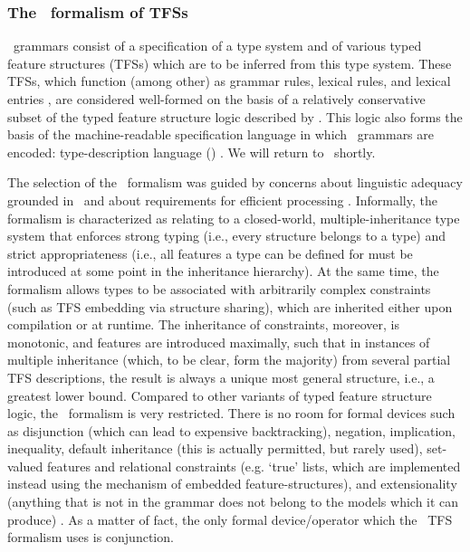 
\subsubsection{The \delphin\ formalism of TFSs}
\label{ssub:delphin}

\delphin\ grammars consist of a specification of a type system and of various
typed feature structures (TFSs) which are to be inferred from this type system.
These TFSs, which function (among other) as grammar rules, lexical rules, and
lexical entries \citep{copestake2000appendix}, are considered well-formed on
the basis of a relatively conservative subset of the typed feature structure
logic described by \citet{carpenter1992logic}. This logic also forms the basis
of the machine-readable specification language in which \delphin\ grammars are
encoded: type-description language (\tdl) \citep{krieger1994tdl}. We will
return to \tdl\ shortly.

The selection of the \delphin\ formalism was guided by concerns about
linguistic adequacy grounded in \hpsg\ and about requirements for efficient
processing \citep{oepen2010disambiguate}. Informally, the formalism is
characterized as relating to a closed-world, multiple-inheritance type system
that enforces strong typing (i.e., every structure belongs to a type) and
strict appropriateness (i.e., all features a type can be defined for must be
introduced at some point in the inheritance hierarchy). At the same time, the
formalism allows types to be associated with arbitrarily complex constraints
(such as TFS embedding via structure sharing), which are inherited either upon
compilation or at runtime. The inheritance of constraints, moreover, is
monotonic, and features are introduced maximally, such that in instances of
multiple inheritance (which, to be clear, form the majority) from several
partial TFS descriptions, the result is always a unique most general structure,
i.e., a greatest lower bound. Compared to other variants of typed feature
structure logic, the \delphin\ formalism is very restricted. There is no room
for formal devices such as disjunction (which can lead to expensive
backtracking), negation, implication, inequality, default inheritance (this is
actually permitted, but rarely used), set-valued features and relational
constraints (e.g. `true' lists, which are implemented instead using the
mechanism of embedded feature-structures), and extensionality (anything that is
not in the grammar does not belong to the models which it can produce)
\citep{copestake2000appendix}. As a matter of fact, the only formal
device/operator which the \delphin\ TFS formalism uses is conjunction.


